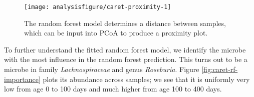 \begin{knitrout}
\color{fgcolor}
\end{knitrout}
\begin{figure}[H]
\texttt{[image: analysisfigure/caret-proximity-1]}
\caption{The random forest model determines a distance between
  samples, which can be input into PCoA to produce a proximity plot.}
\label{fig:caret-proximity}
\end{figure}

To further understand the fitted random forest model, we identify the
microbe with the most influence in the random forest prediction. This
turns out to be a microbe in family \emph{Lachnospiraceae} and genus
\emph{Roseburia}. Figure \ref{fig:caret-rf-importance} plots its abundance
across samples; we see that it is uniformly very low from age 0 to 100
days and much higher from age 100 to 400 days.


